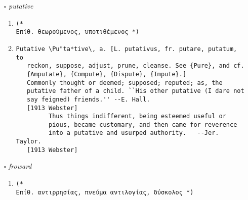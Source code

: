 \documentclass{article}
\begin{document}
\begin{itemize}
\begin{enumerate}
{\begin{lstlisting}
      operation; interval of rest; pause; delay. ``Without more
      respite.'' --Chaucer.
      [1913 Webster]
            Some pause and respite only I require. --Denham.
      [1913 Webster]
   3. (Law)
      (a) Temporary suspension of the execution of a capital
          offender; reprieve.
      (b) The delay of appearance at court granted to a jury
          beyond the proper term.
          [1913 Webster]
   Syn: Pause; interval; stop; cessation; delay; postponement;
        stay; reprieve.
        [1913 Webster]
Respite \Res"pite\, v. t. [imp. & p. p. {Respited}; p. pr. & vb.
   n. {Respiting}.] [OF. respiter, LL. respectare. See
   {Respite}, n.]
   To give or grant a respite to. Specifically:
   (a) To delay or postpone; to put off.
   (b) To keep back from execution; to reprieve.
       [1913 Webster]
             Forty days longer we do respite you. --Shak.
       [1913 Webster]
   (c) To relieve by a pause or interval of rest. ``To respite
       his day labor with repast.'' --Milton.
       [1913 Webster]
\end{lstlisting}}
\end{enumerate}
\item[$\square$] \emph{ putative }
\begin{enumerate}
\item{
\begin{lstlisting}
(* 
Επίθ. θεωρούμενος, υποτιθέμενος *)
\end{lstlisting}}
\item{
\begin{lstlisting}
Putative \Pu"ta*tive\, a. [L. putativus, fr. putare, putatum, to
   reckon, suppose, adjust, prune, cleanse. See {Pure}, and cf.
   {Amputate}, {Compute}, {Dispute}, {Impute}.]
   Commonly thought or deemed; supposed; reputed; as, the
   putative father of a child. ``His other putative (I dare not
   say feigned) friends.'' --E. Hall.
   [1913 Webster]
         Thus things indifferent, being esteemed useful or
         pious, became customary, and then came for reverence
         into a putative and usurped authority.   --Jer. Taylor.
   [1913 Webster]
\end{lstlisting}}
\end{enumerate}
\item[$\square$] \emph{ froward }
\begin{enumerate}
\item{
\begin{lstlisting}
(* 
Επίθ. αντιρρησίας, πνεύμα αντιλογίας, δύσκολος *)
\end{lstlisting}}

\end{enumerate}
\end{itemize}
\end{document}
